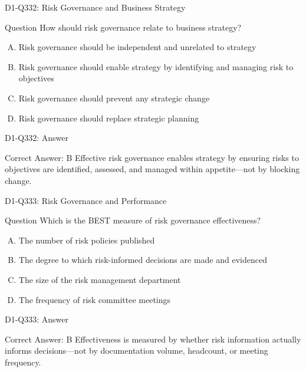 \documentclass{beamer}
\begin{document}
\begin{frame}{D1-Q332: Risk Governance and Business Strategy}
	\begin{block}{Question}
		How should risk governance relate to business strategy?
	\end{block}
	\begin{enumerate}[(A)]
		\item Risk governance should be independent and unrelated to strategy
		\item Risk governance should enable strategy by identifying and managing risk to objectives
		\item Risk governance should prevent any strategic change
		\item Risk governance should replace strategic planning
	\end{enumerate}
\end{frame}
\begin{frame}{D1-Q332: Answer}
	\begin{block}{Correct Answer: B}
		Effective risk governance enables strategy by ensuring risks to objectives are identified, assessed, and managed within appetite—not by blocking change.
	\end{block}
\end{frame}

\begin{frame}{D1-Q333: Risk Governance and Performance}
	\begin{block}{Question}
		Which is the BEST measure of risk governance effectiveness?
	\end{block}
	\begin{enumerate}[(A)]
		\item The number of risk policies published
		\item The degree to which risk-informed decisions are made and evidenced
		\item The size of the risk management department
		\item The frequency of risk committee meetings
	\end{enumerate}
\end{frame}
\begin{frame}{D1-Q333: Answer}
	\begin{block}{Correct Answer: B}
		Effectiveness is measured by whether risk information actually informs decisions—not by documentation volume, headcount, or meeting frequency.
	\end{block}
\end{frame}
\end{document}
